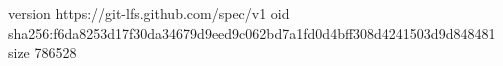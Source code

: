 version https://git-lfs.github.com/spec/v1
oid sha256:f6da8253d17f30da34679d9eed9c062bd7a1fd0d4bff308d4241503d9d848481
size 786528
